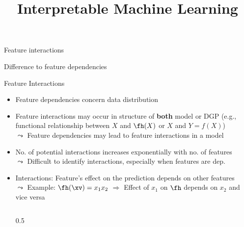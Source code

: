 \documentclass[10pt,compress,t,notes=noshow, xcolor=table]{beamer}
\title{Interpretable Machine Learning}
\date{}
\begin{document}
{
\item Feature interactions
\item Difference to feature dependencies
}


\begin{frame}{Feature Interactions}
\begin{itemize}
\item Feature dependencies concern data distribution
\item Feature interactions may occur in structure of \textbf{both} model or DGP (e.g., functional relationship between $X$ and $\fh(X)$ or $X$ and $Y = f(X)$)\\
$\leadsto$ Feature dependencies may lead to feature interactions in a model
\pause
\item No. of potential interactions increases exponentially with no. of features \\
$\leadsto$ Difficult to identify interactions, especially when features are dep.
\pause
\item Interactions: Feature's effect on the prediction depends on other features\\
$\leadsto$ Example:
$\fh(\xv) = x_1 x_2$ $\Rightarrow$ Effect of $x_1$ on $\fh$ depends on $x_2$ and vice versa 

\begin{columns}[T, totalwidth=\textwidth]
\begin{column}{0.5\textwidth}
\vspace{0.5cm}
\centering
{}
\end{column}
\end{columns}
\end{itemize}
\end{frame}
\end{document}
